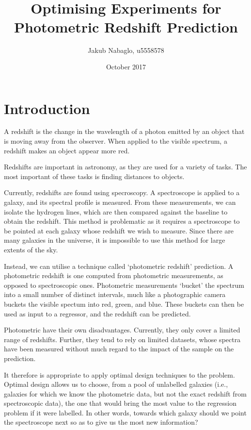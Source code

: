 \documentclass[11pt,twoside]{report}
\title{Optimising Experiments for Photometric Redshift Prediction}
\author{Jakub Nabaglo, u5558578}
\date{October 2017}
\begin{document}
\maketitle

\tableofcontents

\chapter{Introduction}
A redshift is the change in the wavelength of a photon emitted by an object that is moving away from the observer. When applied to the visible spectrum, a redshift makes an object appear more red.

Redshifts are important in astronomy, as they are used for a variety of tasks. The most important of these tasks is finding distances to objects.

Currently, redshifts are found using specroscopy. A spectroscope is applied to a galaxy, and its spectral profile is measured. From these measurements, we can isolate the hydrogen lines, which are then compared against the baseline to obtain the redshift. This method is problematic as it requires a spectroscope to be pointed at each galaxy whose redshift we wish to measure. Since there are many galaxies in the universe, it is impossible to use this method for large extents of the sky.

Instead, we can utilise a technique called `photometric redshift' prediction. A photometric redshift is one computed from photometric measurements, as opposed to spectroscopic ones. Photometric measurements `bucket' the spectrum into a small number of distinct intervals, much like a photographic camera buckets the visible spectum into red, green, and blue. These buckets can then be used as input to a regressor, and the redshift can be predicted.

Photometric have their own disadvantages. Currently, they only cover a limited range of redshifts. Further, they tend to rely on limited datasets, whose spectra have been measured without much regard to the impact of the sample on the prediction.

It therefore is appropriate to apply optimal design techniques to the problem. Optimal design allows us to choose, from a pool of unlabelled galaxies (i.e., galaxies for which we know the photometric data, but not the exact redshift from spectroscopic data), the one that would bring the most value to the regression problem if it were labelled. In other words, towards which galaxy should we point the spectroscope next so as to give us the most new information?
\end{document}

